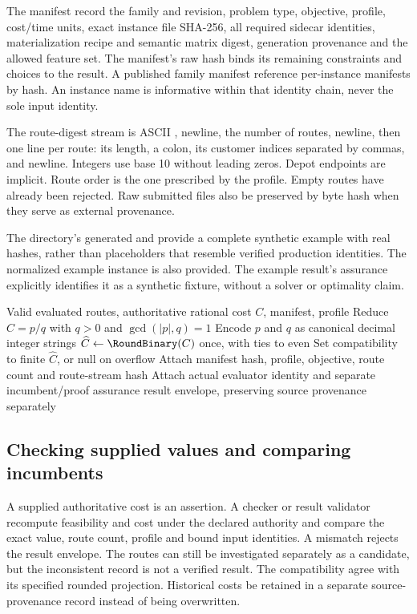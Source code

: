 The manifest \must{} record the family and revision, problem type, objective, profile, cost/time units, exact instance file SHA-256, all required sidecar identities, materialization recipe and semantic matrix digest, generation provenance and the allowed feature set. The manifest's raw hash binds its remaining constraints and choices to the result. A published family manifest \may{} reference per-instance manifests by hash. An instance name is informative within that identity chain, never the sole input identity.

The route-digest stream is ASCII , newline, the number of routes, newline, then one line per route: its length, a colon, its customer indices separated by commas, and newline. Integers use base 10 without leading zeros. Depot endpoints are implicit. Route order is the one prescribed by the profile. Empty routes have already been rejected. Raw submitted files \should{} also be preserved by byte hash when they serve as external provenance.

The directory's generated  and  provide a complete synthetic example with real hashes, rather than placeholders that resemble verified production identities. The normalized example instance is also provided. The example result's assurance explicitly identifies it as a synthetic fixture, without a solver or optimality claim.

\begin{algorithm}[htbp]
\caption{Serialize a valid authoritative result}
\begin{algorithmic}[1]
\Require Valid evaluated routes, authoritative rational cost $C$, manifest, profile
\State Reduce $C=p/q$ with $q>0$ and $\gcd(|p|,q)=1$
\State Encode $p$ and $q$ as canonical decimal integer strings
\State $\widehat C\gets\RoundBinary(C)$ once, with ties to even
\State Set compatibility  to finite $\widehat C$, or null on overflow
\State Attach manifest hash, profile, objective, route count and route-stream hash
\State Attach actual evaluator identity and separate incumbent/proof assurance
\State \Return result envelope, preserving source provenance separately
\end{algorithmic}
\end{algorithm}

\subsection{Checking supplied values and comparing incumbents}
A supplied authoritative cost is an assertion. A checker or result validator \must{} recompute feasibility and cost under the declared authority and compare the exact value, route count, profile and bound input identities. A mismatch rejects the result envelope. The routes can still be investigated separately as a candidate, but the inconsistent record is not a verified result. The compatibility  \must{} agree with its specified rounded projection. Historical costs \may{} be retained in a separate source-provenance record instead of being overwritten.

